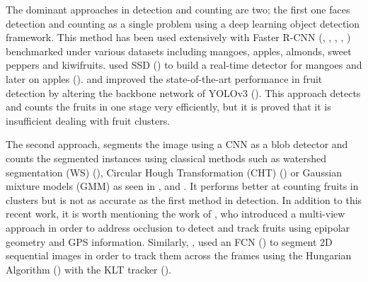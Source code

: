 The dominant approaches in detection and counting are two; the first one faces detection and counting as a single problem using a deep learning object detection framework. This method has been used extensively with Faster R-CNN (\cite{bargoti2017deep}, \cite{sa2016deepfruits}, \cite{mai2018faster}, \cite{fu2018kiwifruit}, \cite{gene2019multi}) benchmarked under various datasets including mangoes, apples, almonds, sweet peppers and kiwifruits. \cite{liang2018real} used SSD (\cite{liu2016ssd}) to build a real-time detector for mangoes and later on apples (\cite{liang2018apple}). \cite{tian2019apple} and \cite{koirala2019deep} improved the state-of-the-art performance in fruit detection by altering the backbone network of YOLOv3 (\cite{redmon2018yolov3}). This approach detects and counts the fruits in one stage very efficiently, but it is proved that it is insufficient dealing with fruit clusters. 

The second approach, segments the image using a CNN as a blob detector and counts the segmented instances using classical methods such as watershed segmentation (WS) (\cite{beucher1992watershed}), Circular Hough Transformation (CHT) (\cite{atherton1999size}) or Gaussian mixture models (GMM) as seen in \cite{hani2018comparative}, \cite{bargoti2017image} and  \cite{chen2017counting}. It performs better at counting fruits in clusters but is not as accurate as the first method in detection. In addition to this recent work, it is worth mentioning the work of \cite{stein2016image}, who introduced a multi-view approach in order to address occlusion to detect and track fruits using epipolar geometry and GPS information. Similarly, \cite{liu2018robust}, used an FCN (\cite{long2015fully}) to segment 2D sequential images in order to track them across the frames using the Hungarian Algorithm (\cite{kuhn1955hungarian}) with the KLT tracker (\cite{lucas1981iterative}).

